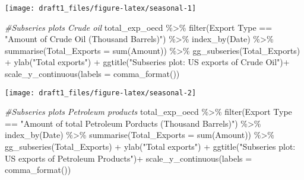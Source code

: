 \documentclass[
]{article}
\newenvironment{Shaded}{\begin{snugshade}}{\end{snugshade}}
\newcommand{\AttributeTok}[1]{\textcolor[rgb]{0.77,0.63,0.00}{#1}}
\newcommand{\CommentTok}[1]{\textcolor[rgb]{0.56,0.35,0.01}{\textit{#1}}}
\newcommand{\FunctionTok}[1]{\textcolor[rgb]{0.00,0.00,0.00}{#1}}
\newcommand{\NormalTok}[1]{#1}
\newcommand{\SpecialCharTok}[1]{\textcolor[rgb]{0.00,0.00,0.00}{#1}}
\newcommand{\StringTok}[1]{\textcolor[rgb]{0.31,0.60,0.02}{#1}}
\begin{document}
\begin{center}\texttt{[image: draft1\_files/figure-latex/seasonal-1]} \end{center}

\begin{Shaded}
\begin{Highlighting}[]
\CommentTok{\#Subseries plots Crude oil}
\NormalTok{total\_exp\_oecd }\SpecialCharTok{\%\textgreater{}\%} \FunctionTok{filter}\NormalTok{(}\StringTok{\textasciigrave{}}\AttributeTok{Export Type}\StringTok{\textasciigrave{}} \SpecialCharTok{==} \StringTok{"Amount of Crude Oil (Thousand Barrels)"}\NormalTok{) }\SpecialCharTok{\%\textgreater{}\%} 
  \FunctionTok{index\_by}\NormalTok{(Date) }\SpecialCharTok{\%\textgreater{}\%} 
  \FunctionTok{summarise}\NormalTok{(}\AttributeTok{Total\_Exports =} \FunctionTok{sum}\NormalTok{(}\StringTok{\textasciigrave{}}\AttributeTok{Amount}\StringTok{\textasciigrave{}}\NormalTok{)) }\SpecialCharTok{\%\textgreater{}\%} 
  \FunctionTok{gg\_subseries}\NormalTok{(Total\_Exports) }\SpecialCharTok{+} 
  \FunctionTok{ylab}\NormalTok{(}\StringTok{"Total exports"}\NormalTok{) }\SpecialCharTok{+} 
  \FunctionTok{ggtitle}\NormalTok{(}\StringTok{"Subseries plot: US exports of Crude Oil"}\NormalTok{)}\SpecialCharTok{+}
  \FunctionTok{scale\_y\_continuous}\NormalTok{(}\AttributeTok{labels =} \FunctionTok{comma\_format}\NormalTok{())}
\end{Highlighting}
\end{Shaded}

\begin{center}\texttt{[image: draft1\_files/figure-latex/seasonal-2]} \end{center}

\begin{Shaded}
\begin{Highlighting}[]
\CommentTok{\#Subseries plots Petroleum products}
\NormalTok{total\_exp\_oecd }\SpecialCharTok{\%\textgreater{}\%} \FunctionTok{filter}\NormalTok{(}\StringTok{\textasciigrave{}}\AttributeTok{Export Type}\StringTok{\textasciigrave{}} \SpecialCharTok{==} \StringTok{"Amount of total Petroleum Porducts (Thousand Barrels)"}\NormalTok{) }\SpecialCharTok{\%\textgreater{}\%} 
  \FunctionTok{index\_by}\NormalTok{(Date) }\SpecialCharTok{\%\textgreater{}\%} 
  \FunctionTok{summarise}\NormalTok{(}\AttributeTok{Total\_Exports =} \FunctionTok{sum}\NormalTok{(}\StringTok{\textasciigrave{}}\AttributeTok{Amount}\StringTok{\textasciigrave{}}\NormalTok{)) }\SpecialCharTok{\%\textgreater{}\%} 
  \FunctionTok{gg\_subseries}\NormalTok{(Total\_Exports) }\SpecialCharTok{+} 
  \FunctionTok{ylab}\NormalTok{(}\StringTok{"Total exports"}\NormalTok{) }\SpecialCharTok{+} 
  \FunctionTok{ggtitle}\NormalTok{(}\StringTok{"Subseries plot: US exports of Petroleum Products"}\NormalTok{)}\SpecialCharTok{+}
  \FunctionTok{scale\_y\_continuous}\NormalTok{(}\AttributeTok{labels =} \FunctionTok{comma\_format}\NormalTok{())}
\end{Highlighting}
\end{Shaded}
\end{document}
